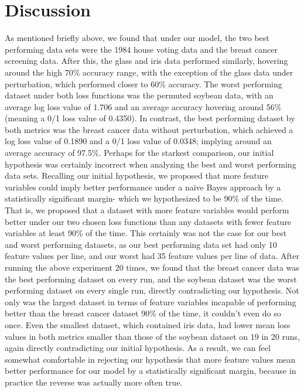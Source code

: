 \documentclass[twoside,11pt]{article}
\begin{document}
\section{Discussion}
As mentioned briefly above, we found that under our model, the two best performing data sets were the 1984 house voting data and the breast cancer screening data. After this, the glass and iris
data performed similarly, hovering around the high 70\% accuracy range, with the exception of the glass data under perturbation, which performed closer to 60\% accuracy. The worst performing dataset
under both loss functions was the permuted soybean data, with an average log loss value of 1.706 and an average accuracy hovering around 56\% (meaning a 0/1 loss value of 0.4350). In contrast,
the best performing dataset by both metrics was the breast cancer data without perturbation, which achieved a log loss value of 0.1890 and a 0/1 loss value of 0.0348; implying around an average 
accuracy of 97.5\%. Perhaps for the starkest comparison, our initial hypothesis was certainly incorrect when analyzing the best and worst performing data sets. Recalling our initial hypothesis, we proposed
that more feature variables could imply better performance under a na{\"i}ve Bayes approach by a statistically significant margin- which we hypothesized to be 90\% of the time. That is, we proposed that 
a dataset with more feature variables would perform better under our two chosen loss functions than any datasets with fewer feature variables at least 90\% of the time. This certainly was not the case for our
best and worst performing datasets, as our best performing data set had only 10 feature values per line, and our worst had 35 feature values per line of data. After running the above experiment 20 times, we 
found that the breast cancer data was the best performing dataset on every run, and the soybean dataset was the worst performing dataset on every single run, directly contradicting our hypothesis. Not only 
was the largest dataset in terms of feature variables incapable of performing better than the breast cancer dataset 90\% of the time, it couldn't even do so once.
Even the smallest dataset, which contained iris data, had lower mean loss values in both metrics smaller than those of the soybean dataset on 19 in 20 runs, again directly contradicting our initial hypothesis. 
As a result, we can feel somewhat comfortable in rejecting our hypothesis that more feature values mean better performance for our model by a statistically significant margin, because in practice
the reverse was actually more often true.
\end{document}
